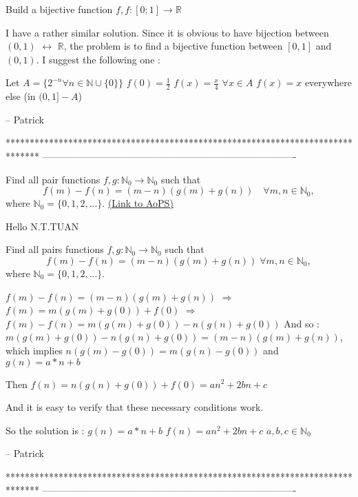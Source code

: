 \begin{mysolution}
	\begin{tcolorbox}Build a bijective function $f, f: [0;1]\to \mathbb R$\end{tcolorbox}

I have a rather similar solution.
Since it is obvious to have bijection between $(0,1)$ $\leftrightarrow$ $\mathbb{R}$, the problem is to find a bijective function between $[0,1]$ and $(0,1)$. I suggest the following one : 

Let $A=\{2^{-n}\forall n \in \mathbb{N}\cup\{0\}\}$
$f(0)=\frac{1}{2}$
$f(x)=\frac{x}{4}$  ${\forall x\in A}$
$f(x)=x$ everywhere else (in $(0,1]-A$)

-- 
Patrick
\end{mysolution}
*******************************************************************************
-------------------------------------------------------------------------------

\begin{problem}
	Find all pair functions $f,g: \mathbb{N}_{0}\to\mathbb{N}_{0}$ such that \[f(m)-f(n)=(m-n)(g(m)+g(n))\quad \forall m,n\in\mathbb{N}_{0},\]
where $\mathbb{N}_{0}=\{0,1,2,...\}$.
	\flushright \href{https://artofproblemsolving.com/community/c6h149447}{(Link to AoPS)}
\end{problem}



\begin{mysolution}
	Hello N.T.TUAN

 \begin{tcolorbox}Find all pairs functions $f,g: \mathbb{N}_{0}\to\mathbb{N}_{0}$ such that
\[f(m)-f(n)=(m-n)(g(m)+g(n))\; \forall m,n\in\mathbb{N}_{0}, \]
where $\mathbb{N}_{0}=\{0,1,2,...\}$.\end{tcolorbox}

$f(m)-f(n)=(m-n)(g(m)+g(n))$ $\Rightarrow $ $f(m)=m(g(m)+g(0))+f(0)$ $\Rightarrow $ $f(m)-f(n)=m(g(m)+g(0))-n(g(n)+g(0))$
And so : $m(g(m)+g(0))-n(g(n)+g(0))=(m-n)(g(m)+g(n))$, which implies $n(g(m)-g(0))=m(g(n)-g(0))$ and $g(n)=a*n+b$

Then $f(n)=n(g(n)+g(0))+f(0)=an^{2}+2bn+c$

And it is easy to verify that these necessary conditions work.

So the solution is :
$g(n)=a*n+b$
$f(n)=an^{2}+2bn+c$
$a,b,c\in\mathbb{N}_{0}$

-- 
Patrick
\end{mysolution}
*******************************************************************************
-------------------------------------------------------------------------------

